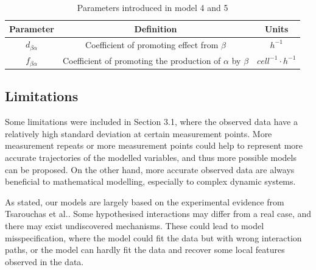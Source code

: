 \begin{table}[h!]
    \centering
    \begin{tabular}{|c c c|}
        \hline
        Parameter         & Definition                                                     & Units                    \\ [0.5ex]
        \hline\hline
        $d_{\beta\alpha}$ & Coefficient of promoting effect from $\beta$                   & $h^{-1}$                 \\
        \hline
        $f_{\beta\alpha}$ & Coefficient of promoting the production of $\alpha$ by $\beta$ & $cell^{-1}\cdotp h^{-1}$ \\
        \hline
    \end{tabular}
    \caption{Parameters introduced in model 4 and 5}
    \label{table:m45}
\end{table}







\subsection{Limitations}




Some limitations were included in Section 3.1, where the observed data have a relatively high standard deviation at certain measurement points. More measurement repeats or more measurement points could help to represent more accurate trajectories of the modelled variables, and thus more possible models can be proposed. On the other hand, more accurate observed data are always beneficial to mathematical modelling, especially to complex dynamic systems.

As stated, our models are largely based on the experimental evidence from Tsarouchas et al.\cite{ref:Tsarouchas}. Some hypothesised interactions may differ from a real case, and there may exist undiscovered mechanisms. These could lead to model misspecification, where the model could fit the data but with wrong interaction paths, or the model can hardly fit the data and recover some local features observed in the data.

